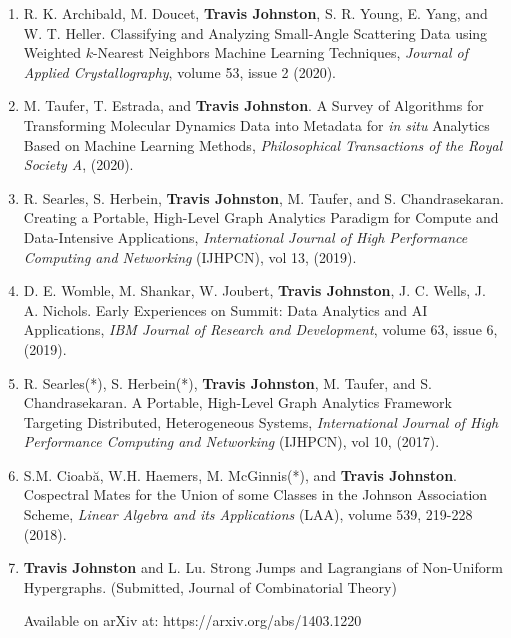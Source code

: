 \documentclass{article}
\begin{document}
	\begin{enumerate}[1.]
        \item R. K. Archibald, M. Doucet, \textbf{Travis Johnston}, S. R. Young, E. Yang, and W. T. Heller.
        Classifying and Analyzing Small-Angle Scattering Data using Weighted $k$-Nearest Neighbors Machine Learning Techniques,
        \textit{Journal of Applied Crystallography}, volume 53, issue 2 (2020).


        \item M. Taufer, T. Estrada, and \textbf{Travis Johnston}.
        A Survey of Algorithms for Transforming Molecular Dynamics Data into Metadata for \textit{in situ} Analytics Based on Machine Learning Methods,
        \textit{Philosophical Transactions of the Royal Society A}, (2020).
        

        \item R. Searles, S. Herbein, \textbf{Travis Johnston}, M. Taufer, and S. Chandrasekaran.
        Creating a Portable, High-Level Graph Analytics Paradigm for Compute and Data-Intensive Applications,
        \textit{International Journal of High Performance Computing and Networking} (IJHPCN), vol 13, (2019).

        \item D. E. Womble, M. Shankar, W. Joubert, \textbf{Travis Johnston}, J. C. Wells, J. A. Nichols.
        Early Experiences on Summit: Data Analytics and AI Applications,
        \textit{IBM Journal of Research and Development}, volume 63, issue 6, (2019).


		\item R. Searles(*), S. Herbein(*), \textbf{Travis Johnston}, M. Taufer, and S. Chandrasekaran.
		A Portable, High-Level Graph Analytics Framework Targeting Distributed, Heterogeneous Systems,
		\textit{International Journal of High Performance Computing and Networking} (IJHPCN), vol 10, (2017).

		
		\item S.M. Cioab\u{a}, W.H. Haemers, M. McGinnis(*), and \textbf{Travis Johnston}.
		Cospectral Mates for the Union of some Classes in the Johnson Association Scheme, \textit{Linear Algebra and its Applications} (LAA),
        volume 539, 219-228 (2018). 

		
		\item \textbf{Travis Johnston} and L. Lu.  Strong Jumps and Lagrangians of Non-Uniform Hypergraphs.  (Submitted, Journal of Combinatorial Theory)
		
		Available on arXiv at: https://arxiv.org/abs/1403.1220



\end{enumerate}
\end{document}

